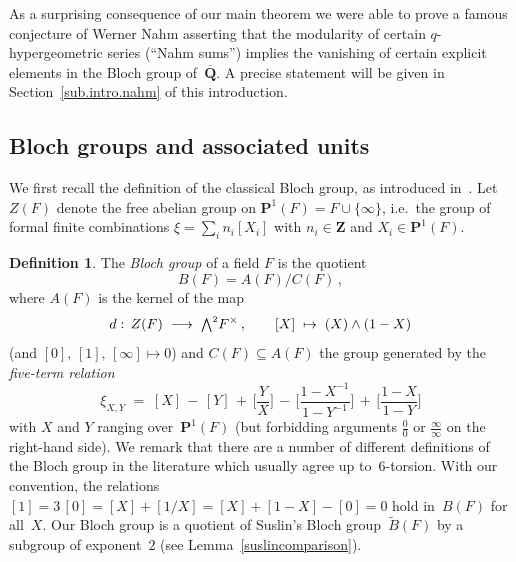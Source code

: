 \documentclass[12pt,reqno]{amsart}
\theoremstyle{definition}
\newtheorem{definition}[theorem]{Definition}
\newcommand{\changed}[1]{{#1}}
\newcommand{\frankchanged}[1]{{#1}}
\def\BB{\widetilde{B}}
\def\be{\begin{equation}}
\def\ee{\end{equation}}
\def\+{\,+\,}
\def\m{\,-\,}
\def\={\;=\;}
\def\Q{\mathbf Q}   %
\def\Z{\mathbf Z}   %
\def\wed{\small{\bigwedge}^2}
\def\wed{\mbox{\small$\bigwedge^2$}}
\def\BP{\mathbf P}
\def\P{\BP}
\def\map{\;\longrightarrow\;}
\def\Qbar{\overline{\Q}}
\begin{document}
As a surprising consequence of our main theorem we were able to prove
\changed{a famous conjecture of Werner Nahm asserting} that the
modularity of certain $q$-hypergeometric series (``Nahm sums'') implies
the vanishing of certain explicit elements in the Bloch group of~$\Qbar$.
A precise statement will be given in Section~\ref{sub.intro.nahm} of this
introduction.

\subsection{Bloch groups and associated units}
\label{sub.intro.bloch} 

We first recall the definition of the classical Bloch group, as introduced 
in~\cite{Bloch}. Let~$Z(F)$ denote the free abelian group on 
$\P^1(F)=F\cup\{\infty\}$, i.e.~the group of 
formal finite combinations  $\xi=\sum_i n_i [X_i]$ with 
$n_i\in\Z$ and $X_i\in\P^1(F)$.

\begin{definition}
\label{def.BF} 
The {\it Bloch group} of a field $F$ is the quotient 
\be
\label{defBF}
B(F)=A(F)/C(F)\,, 
\ee
where $A(F)$ is the kernel of the map 
\be
\label{defd}
d:\,Z(F)\map \wed F^{\times}\,, \qquad [X]\;\mapsto\; (X) \wedge (1-X) 
\ee
(and $[0],\,[1],\,[\infty]\mapsto0$) and $C(F)\subseteq A(F)$ the group 
generated by the {\it five-term relation}
\be
\label{5term}
\xi_{X,Y} \= [X] \m [Y] \+  \biggl[ \frac{Y}{X}\biggr] 
\m \biggl[\frac{1-X^{-1}}{1-Y^{-1}}\biggr] \+ \biggl[\frac{1-X}{1-Y} \biggr]
\ee
with $X$ and $Y$ ranging over~$\P^1(F)$ (but forbidding arguments 
$\frac00$ or $\frac\infty\infty$ on the right-hand side). 
%  
\changed{We remark that there are a number of different definitions of the Bloch
  group in the literature which usually agree up to~$6$-torsion. With our convention, 
 the relations $[1]=3\,[0]=[X]+[1/X]=[X]+[1-X]-[0]=0$ hold in~$B(F)$ for all~$X$.}
 \frankchanged{Our Bloch group is a quotient of Suslin's Bloch group~$\BB(F)$
 by a subgroup of exponent~$2$ (see Lemma~\ref{suslincomparison}).}
% 
% 
\end{definition}
\end{document}
